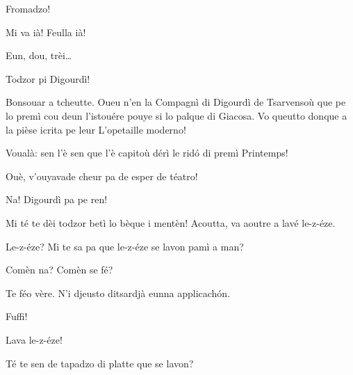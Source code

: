 \begin{drama}

\Fotografespeaks{} Fromadzo!

\Tcheuttespeaks {} Mi va ià! Feulla ià!


\Joelspeaks Eun, dou, trèi\ldots

\Tcheuttespeaks{} Todzor pi Digourdì!



\Joelspeaks Bonsouar a tcheutte. Oueu n'en la Compagnì di Digourdì de Tsarvensoù que pe lo premì cou deun l'istouére pouye si lo palque di Giacosa. Vo queutto donque a la pièse icrita pe leur \og L'opetaille moderno\fg{}!



\Maganspeaks Voualà: sen l'è sen que l'è capitoù dérì le rid\'o di premì Printemps!

\Nevaouspeaks{} Ouè, v'ouyavade cheur pa de esper de téatro!

\Maganspeaks Na! Digourdì pa pe ren!

\Paganspeaks{}  Mi té te dèi todzor betì lo bèque i mentèn! Acoutta, va aoutre a lavé le-z-éze.

\Maganspeaks Le-z-éze? Mi te sa pa que le-z-éze se lavon pamì a man?

\Paganspeaks Comèn na? Comèn se fé?

\Maganspeaks Te féo vère.  N'i djeusto di\-tsardjà eunna applicach\'on.


\Maganspeaks{} Fuffi!


\Maganspeaks{} Lava le-z-éze!


\Maganspeaks{} Té te sen de tapadzo di platte que se lavon?


\end{drama}
